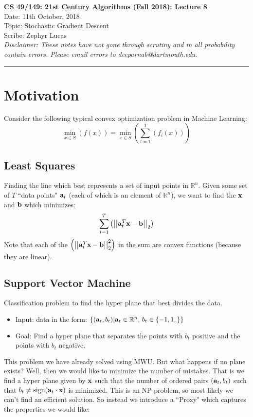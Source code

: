 \documentclass[11pt]{article}
\newcommand{\ltnorm} [1] {
  \left| \left| #1 \right| \right|_{2}
}
\begin{document}
	\begin{center}
		{\bf \Large CS 49/149: 21st Century Algorithms (Fall 2018): Lecture 8}\\ 
		Date: 11th October, 2018 \\
		Topic: Stochastic Gradient Descent \\
		Scribe: Zephyr Lucas \\
		{\em Disclaimer: These notes have not gone through scrutiny and in all probability contain errors. Please email errors to deeparnab@dartmouth.edu.}
	\end{center}
\hrule height 2pt
\vspace{3ex}
\def\loss{\mathsf{loss}}
\section{Motivation}

Consider the following typical convex optimization problem in Machine Learning:
\begin{equation}
\min_{x \in S} \left( f(x) \right) = \min_{x \in S} \left( \sum_{t = 1}^{T} \left( f_{i} (x) \right) \right)
\end{equation}

\subsection{Least Squares}
Finding the line which best represents a set of input points in $\mathbb{R}^{n}$.  Given some set of $T$ ``data points" ${\bf a}_{t}$  (each of which is an element of $\mathbb{R}^{n}$), we want to find the ${\bf x}$ and ${\bf b}$ which minimizes:
\begin{equation}
\sum_{t = 1}^{T} \left( \ltnorm{{\bf a}_{t}^{T} {\bf x} - {\bf b}} \right)
\end{equation}
Note that each of the $\left( \ltnorm{{\bf a}_{t}^{T} {\bf x} - {\bf b}}^{2} \right)$ in the sum are convex functions (because they are linear).

\subsection{Support Vector Machine}
Classification problem to find the hyper plane that best divides the data.
\begin{itemize}
\item Input: data in the form: $ \left\lbrace ({\bf a}_{t}, b_{t}) | {\bf a}_{t} \in \mathbb{R}^{n} ,\, b_{t} \in \lbrace -1, 1, \rbrace \right\rbrace$
\item Goal: Find a hyper plane that separates the points with $b_{t}$ positive and the points with $b_{t}$ negative.
\end{itemize}
This problem we have already solved using MWU.  But what happens if no plane exists?  Well, then we would like to minimize the number of mistakes.  That is we find a hyper plane given by ${\bf x}$ such that the number of ordered pairs $({\bf a}_{t}, b_{t})$ such that $b_{t} \neq \text{sign} ({\bf a}_{t} \cdot {\bf x})$ is minimized.  This is an NP-problem, so most likely we can't find an efficient solution.  So instead we introduce a ``Proxy" which captures the properties we would like:
\end{document}
